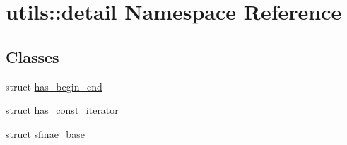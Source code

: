\hypertarget{namespaceutils_1_1detail}{}\section{utils\+::detail Namespace Reference}
\label{namespaceutils_1_1detail}
\subsection*{Classes}
\begin{DoxyCompactItemize}
\item 
struct \mbox{\hyperlink{structutils_1_1detail_1_1has__begin__end}{has\+\_\+begin\+\_\+end}}
\item 
struct \mbox{\hyperlink{structutils_1_1detail_1_1has__const__iterator}{has\+\_\+const\+\_\+iterator}}
\item 
struct \mbox{\hyperlink{structutils_1_1detail_1_1sfinae__base}{sfinae\+\_\+base}}
\end{DoxyCompactItemize}
